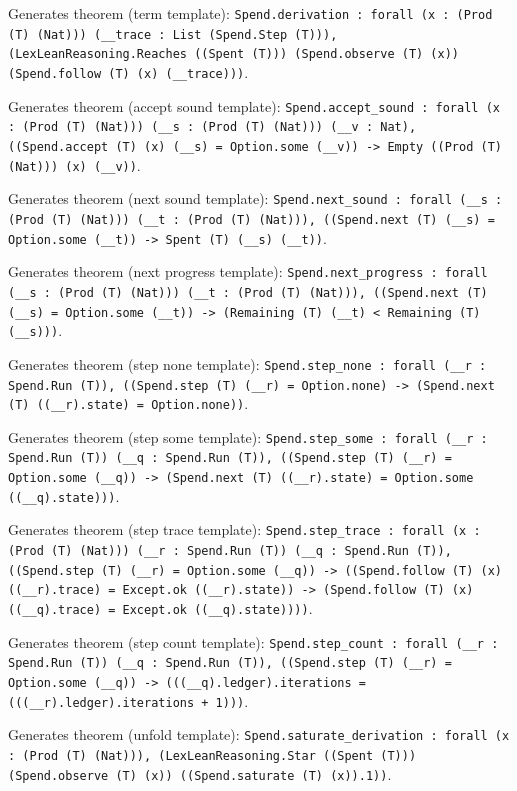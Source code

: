 \documentclass[11pt]{article}
\begin{document}
\noindent Generates theorem (term template): \texttt{Spend.derivation : forall (x : (Prod (T) (Nat))) (\_\_trace : List (Spend.Step (T))), (LexLeanReasoning.Reaches ((Spent (T))) (Spend.observe (T) (x)) (Spend.follow (T) (x) (\_\_trace)))}.\par
\noindent Generates theorem (accept sound template): \texttt{Spend.accept\_sound : forall (x : (Prod (T) (Nat))) (\_\_s : (Prod (T) (Nat))) (\_\_v : Nat), ((Spend.accept (T) (x) (\_\_s) = Option.some (\_\_v)) -> Empty ((Prod (T) (Nat))) (x) (\_\_v))}.\par
\noindent Generates theorem (next sound template): \texttt{Spend.next\_sound : forall (\_\_s : (Prod (T) (Nat))) (\_\_t : (Prod (T) (Nat))), ((Spend.next (T) (\_\_s) = Option.some (\_\_t)) -> Spent (T) (\_\_s) (\_\_t))}.\par
\noindent Generates theorem (next progress template): \texttt{Spend.next\_progress : forall (\_\_s : (Prod (T) (Nat))) (\_\_t : (Prod (T) (Nat))), ((Spend.next (T) (\_\_s) = Option.some (\_\_t)) -> (Remaining (T) (\_\_t) < Remaining (T) (\_\_s)))}.\par
\noindent Generates theorem (step none template): \texttt{Spend.step\_none : forall (\_\_r : Spend.Run (T)), ((Spend.step (T) (\_\_r) = Option.none) -> (Spend.next (T) ((\_\_r).state) = Option.none))}.\par
\noindent Generates theorem (step some template): \texttt{Spend.step\_some : forall (\_\_r : Spend.Run (T)) (\_\_q : Spend.Run (T)), ((Spend.step (T) (\_\_r) = Option.some (\_\_q)) -> (Spend.next (T) ((\_\_r).state) = Option.some ((\_\_q).state)))}.\par
\noindent Generates theorem (step trace template): \texttt{Spend.step\_trace : forall (x : (Prod (T) (Nat))) (\_\_r : Spend.Run (T)) (\_\_q : Spend.Run (T)), ((Spend.step (T) (\_\_r) = Option.some (\_\_q)) -> ((Spend.follow (T) (x) ((\_\_r).trace) = Except.ok ((\_\_r).state)) -> (Spend.follow (T) (x) ((\_\_q).trace) = Except.ok ((\_\_q).state))))}.\par
\noindent Generates theorem (step count template): \texttt{Spend.step\_count : forall (\_\_r : Spend.Run (T)) (\_\_q : Spend.Run (T)), ((Spend.step (T) (\_\_r) = Option.some (\_\_q)) -> (((\_\_q).ledger).iterations = (((\_\_r).ledger).iterations + 1)))}.\par
\noindent Generates theorem (unfold template): \texttt{Spend.saturate\_derivation : forall (x : (Prod (T) (Nat))), (LexLeanReasoning.Star ((Spent (T))) (Spend.observe (T) (x)) ((Spend.saturate (T) (x)).1))}.\par
\end{document}
